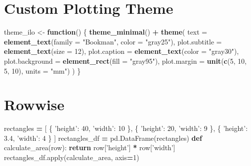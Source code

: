 \documentclass[]{book}
\newenvironment{Shaded}{\begin{snugshade}}{\end{snugshade}}
\newcommand{\BuiltInTok}[1]{#1}
\newcommand{\ControlFlowTok}[1]{\textcolor[rgb]{0.13,0.29,0.53}{\textbf{#1}}}
\newcommand{\DataTypeTok}[1]{\textcolor[rgb]{0.13,0.29,0.53}{#1}}
\newcommand{\DecValTok}[1]{\textcolor[rgb]{0.00,0.00,0.81}{#1}}
\newcommand{\FloatTok}[1]{\textcolor[rgb]{0.00,0.00,0.81}{#1}}
\newcommand{\KeywordTok}[1]{\textcolor[rgb]{0.13,0.29,0.53}{\textbf{#1}}}
\newcommand{\NormalTok}[1]{#1}
\newcommand{\OperatorTok}[1]{\textcolor[rgb]{0.81,0.36,0.00}{\textbf{#1}}}
\newcommand{\StringTok}[1]{\textcolor[rgb]{0.31,0.60,0.02}{#1}}
\begin{document}
\hypertarget{custom-plotting-theme}{%
\section{Custom Plotting Theme}\label{custom-plotting-theme}}

\begin{Shaded}
\begin{Highlighting}[]
\NormalTok{theme_ilo <-}\StringTok{ }\ControlFlowTok{function}\NormalTok{() \{}
    \KeywordTok{theme_minimal}\NormalTok{() }\OperatorTok{+}
\StringTok{        }\KeywordTok{theme}\NormalTok{(}
            \DataTypeTok{text =} \KeywordTok{element_text}\NormalTok{(}\DataTypeTok{family =} \StringTok{"Bookman"}\NormalTok{, }\DataTypeTok{color =} \StringTok{"gray25"}\NormalTok{),}
            \DataTypeTok{plot.subtitle =} \KeywordTok{element_text}\NormalTok{(}\DataTypeTok{size =} \DecValTok{12}\NormalTok{),}
            \DataTypeTok{plot.caption =} \KeywordTok{element_text}\NormalTok{(}\DataTypeTok{color =} \StringTok{"gray30"}\NormalTok{),}
            \DataTypeTok{plot.background =} \KeywordTok{element_rect}\NormalTok{(}\DataTypeTok{fill =} \StringTok{"gray95"}\NormalTok{),}
            \DataTypeTok{plot.margin =} \KeywordTok{unit}\NormalTok{(}\KeywordTok{c}\NormalTok{(}\DecValTok{5}\NormalTok{, }\DecValTok{10}\NormalTok{, }\DecValTok{5}\NormalTok{, }\DecValTok{10}\NormalTok{), }\DataTypeTok{units =} \StringTok{"mm"}\NormalTok{)}
\NormalTok{        )}
\NormalTok{\}}
\end{Highlighting}
\end{Shaded}

\hypertarget{rowwise}{%
\section{Rowwise}\label{rowwise}}

\begin{Shaded}
\begin{Highlighting}[]
\NormalTok{rectangles }\OperatorTok{=}\NormalTok{ [}
\NormalTok{    \{ }\StringTok{'height'}\NormalTok{: }\DecValTok{40}\NormalTok{, }\StringTok{'width'}\NormalTok{: }\DecValTok{10}\NormalTok{ \},}
\NormalTok{    \{ }\StringTok{'height'}\NormalTok{: }\DecValTok{20}\NormalTok{, }\StringTok{'width'}\NormalTok{: }\DecValTok{9}\NormalTok{ \},}
\NormalTok{    \{ }\StringTok{'height'}\NormalTok{: }\FloatTok{3.4}\NormalTok{, }\StringTok{'width'}\NormalTok{: }\DecValTok{4}\NormalTok{ \}}
\NormalTok{]}
\NormalTok{rectangles_df }\OperatorTok{=}\NormalTok{ pd.DataFrame(rectangles)}
\KeywordTok{def}\NormalTok{ calculate_area(row):}
    \ControlFlowTok{return}\NormalTok{ row[}\StringTok{'height'}\NormalTok{] }\OperatorTok{*}\NormalTok{ row[}\StringTok{'width'}\NormalTok{]}
\NormalTok{rectangles_df.}\BuiltInTok{apply}\NormalTok{(calculate_area, axis}\OperatorTok{=}\DecValTok{1}\NormalTok{)}
\end{Highlighting}
\end{Shaded}
\end{document}
